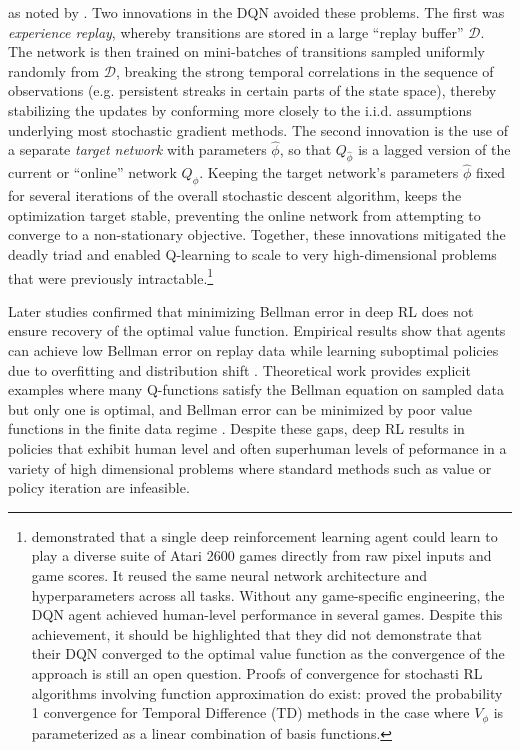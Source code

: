 as noted by \citet{BartoSutton:2020}. Two innovations in the DQN avoided these problems.  
The first was \textit{experience replay}, whereby transitions are stored in a large ``replay buffer'' $\mathcal{D}$. 
The network is then trained on mini-batches of transitions sampled uniformly randomly from $\mathcal{D}$, breaking 
the strong temporal correlations in the sequence of observations (e.g. persistent streaks in certain parts of the state space), 
thereby stabilizing the updates by conforming more closely to the i.i.d. assumptions underlying most stochastic gradient methods.
The second innovation is the use of a separate \textit{target network} with parameters $\hat\phi$,  so
that  $Q_{\hat\phi}$  is a lagged version of the current or ``online'' network $Q_\phi$. 
Keeping the target network's parameters
$\hat\phi$ fixed for several iterations of the overall stochastic descent algorithm, keeps the optimization target stable, 
preventing the online network from attempting to converge to a non-stationary objective. 
Together, these innovations mitigated the deadly triad and enabled Q-learning to scale to very high-dimensional problems that 
were previously intractable.\footnote{\footnotesize 
\citet{mnih:2015} demonstrated that a single deep reinforcement learning agent could learn to play a diverse 
suite of Atari 2600 games directly from raw pixel inputs and game scores. It reused the same neural 
network architecture and hyperparameters across all tasks. Without any game-specific engineering, the DQN agent 
achieved human-level performance in several games. Despite this achievement, 
it should be highlighted that they did not demonstrate that their DQN converged to the optimal value function as
the convergence of the approach is still an open question.  Proofs of convergence for stochasti RL
algorithms involving function approximation do exist: \citet{TsitsiklisVanRoy:1997} proved the probability 1
convergence for Temporal Difference (TD) methods in the case where $V_\phi$ is parameterized as a linear
combination of basis functions.}

Later studies confirmed that minimizing Bellman error in deep RL does not ensure recovery of the optimal value function. Empirical results show that agents can achieve low Bellman error on replay data while learning suboptimal policies due to overfitting and distribution shift \citet{fu2019diagnosing}. Theoretical work provides explicit examples where many Q-functions satisfy the Bellman equation on sampled data but only one is optimal, and Bellman error can be minimized by poor value functions in the finite data regime \citet{fujimoto22a}. Despite these gaps, deep RL results in policies that exhibit human level and often superhuman levels
of peformance in a variety of high dimensional problems where standard methods such as value or policy iteration
 are infeasible.
 

